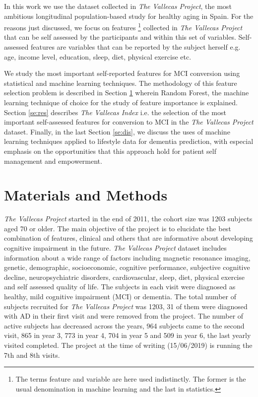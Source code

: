 \documentclass[preprint,12pt]{elsarticle}
\begin{document}
In this work we use the dataset collected in \emph{The Vallecas Project}, the most ambitious longitudinal population-based study for healthy aging in Spain. For the reasons just discussed, we focus on features \footnote{The terms feature and variable are here used indistinctly. The former is the usual denomination in  machine learning and the last in statistics.} collected in \emph{The Vallecas Project} that can be self assessed by the participants and within this set of variables. Self-assessed features are variables that can be reported by the subject herself e.g. age, income level, education, sleep, diet, physical exercise etc.

We study the most important self-reported features for MCI conversion using statistical and machine learning techniques. The methodology of this feature selection problem is described in Section \ref{se:mandm} wherein Random Forest, the machine learning technique of choice for the study of feature importance is explained.
Section \ref{se:res} describes \emph{The Vallecas Index} i.e. the selection of the most important self-assessed features for conversion to MCI in the \emph{The Vallecas Project} dataset. Finally, in the last Section \ref{se:dis}, we discuss the uses of machine learning techniques applied to lifestyle data for dementia prediction, with especial emphasis on the opportunities that this approach hold for patient self management and empowerment. 

\section{Materials and Methods}
\label{se:mandm}

\emph{The Vallecas Project} started in the end of 2011, the cohort size was 1203 subjects aged 70 or older. The main objective of the project is to elucidate the best combination of features, clinical and others that are informative about developing cognitive impairment in the future. 
\emph{The Vallecas Project} dataset includes information about a wide range of factors including magnetic resonance imaging, genetic, demographic, socioeconomic, cognitive performance, subjective cognitive decline, neuropsychiatric disorders, cardiovascular, sleep, diet, physical exercise and self assessed quality of life. The subjects in each visit were diagnosed as healthy, mild cognitive impairment (MCI) or dementia.
The total number of subjects recruited for \emph{The Vallecas Project} was 1203, 31 of them were diagnosed with AD in their first visit and were removed from the project. The number of active subjects has decreased across the years, 964 subjects came to the second visit, 865 in year 3, 773 in year 4, 704 in year 5 and 509 in year 6, the last yearly visited completed. The project at the time of writing (15/06/2019) is running the 7th and 8th visits. 
 
\end{document}
